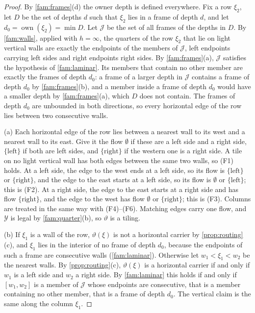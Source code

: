 \begin{proof}
By \cref{fam:frames}(d) the owner depth is defined everywhere. Fix a row $\xi_2$, let $D$ be the set of depths $d$ such that $\xi_2$ lies in a frame of depth $d$, and let $d_0=\operatorname{own}(\xi_2)=\min D$. Let $\mathcal J$ be the set of all frames of the depths in $D$. By \cref{fam:walls}, applied with $h=\infty$, the quarters of the row $\xi_2$ that lie on light vertical walls are exactly the endpoints of the members of $\mathcal J$, left endpoints carrying left sides and right endpoints right sides. By \cref{fam:frames}(a), $\mathcal J$ satisfies the hypothesis of \cref{fam:laminar}. Its members that contain no other member are exactly the frames of depth $d_0$: a frame of a larger depth in $\mathcal J$ contains a frame of depth $d_0$ by \cref{fam:frames}(b), and a member inside a frame of depth $d_0$ would have a smaller depth by \cref{fam:frames}(a), which $D$ does not contain. The frames of depth $d_0$ are unbounded in both directions, so every horizontal edge of the row lies between two consecutive walls.

(a) Each horizontal edge of the row lies between a nearest wall to its west and a nearest wall to its east. Give it the flow $\emptyset$ if these are a left side and a right side, $\{\mathrm{left}\}$ if both are left sides, and $\{\mathrm{right}\}$ if the western one is a right side. A tile on no light vertical wall has both edges between the same two walls, so (F1) holds. At a left side, the edge to the west ends at a left side, so its flow is $\{\mathrm{left}\}$ or $\{\mathrm{right}\}$, and the edge to the east starts at a left side, so its flow is $\emptyset$ or $\{\mathrm{left}\}$; this is (F2). At a right side, the edge to the east starts at a right side and has flow $\{\mathrm{right}\}$, and the edge to the west has flow $\emptyset$ or $\{\mathrm{right}\}$; this is (F3). Columns are treated in the same way with (F4)--(F6). Matching edges carry one flow, and $\mathcal Y$ is legal by \cref{fam:quarter}(b), so $\vartheta$ is a tiling.

(b) If $\xi_1$ is a wall of the row, $\vartheta(\xi)$ is not a horizontal carrier by \cref{prop:routing}(c), and $\xi_1$ lies in the interior of no frame of depth $d_0$, because the endpoints of such a frame are consecutive walls (\cref{fam:laminar}). Otherwise let $w_1<\xi_1<w_2$ be the nearest walls. By \cref{prop:routing}(c), $\vartheta(\xi)$ is a horizontal carrier if and only if $w_1$ is a left side and $w_2$ a right side. By \cref{fam:laminar} this holds if and only if $[w_1,w_2]$ is a member of $\mathcal J$ whose endpoints are consecutive, that is a member containing no other member, that is a frame of depth $d_0$. The vertical claim is the same along the column $\xi_1$.


\end{proof}
